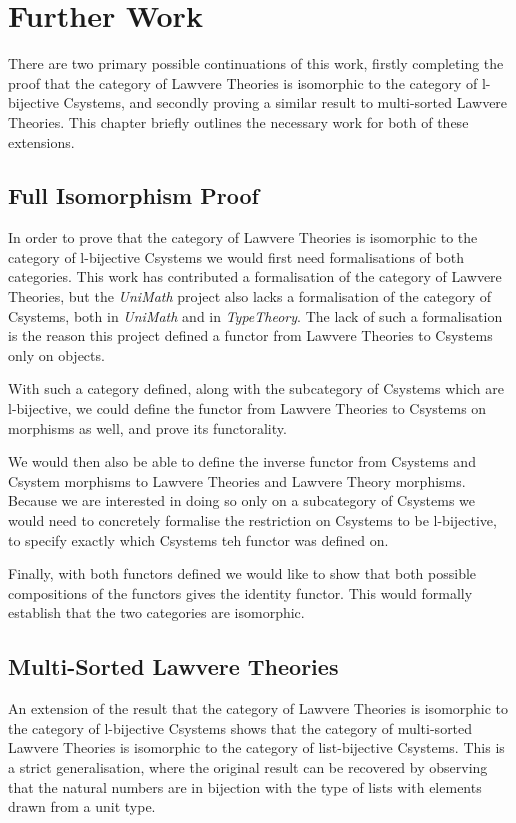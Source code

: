 \chapter{Further Work}
There are two primary possible continuations of this work, firstly completing
the proof that the category of Lawvere Theories is isomorphic to the category of
l-bijective Csystems, and secondly proving a similar result to multi-sorted
Lawvere Theories. This chapter briefly outlines the necessary work for both of
these extensions.

\section{Full Isomorphism Proof}
In order to prove that the category of Lawvere Theories is isomorphic to the
category of l-bijective Csystems we would first need formalisations of both
categories. This work has contributed a formalisation of the category of Lawvere
Theories, but the \textit{UniMath} project also lacks a formalisation of the
category of Csystems, both in \textit{UniMath} and in \textit{TypeTheory}. The
lack of such a formalisation is the reason this project defined a functor from
Lawvere Theories to Csystems only on objects.

With such a category defined, along with the subcategory of Csystems which are
l-bijective, we could define the functor from Lawvere Theories to Csystems on
morphisms as well, and prove its functorality.

We would then also be able to define the inverse functor from Csystems and
Csystem morphisms to Lawvere Theories and Lawvere Theory morphisms. Because we
are interested in doing so only on a subcategory of Csystems we would need to
concretely formalise the restriction on Csystems to be l-bijective, to specify
exactly which Csystems teh functor was defined on.

Finally, with both functors defined we would like to show that both possible
compositions of the functors gives the identity functor. This would formally
establish that the two categories are isomorphic.

\section{Multi-Sorted Lawvere Theories}
An extension of the result that the category of Lawvere Theories is isomorphic
to the category of l-bijective Csystems shows that the category of multi-sorted
Lawvere Theories is isomorphic to the category of list-bijective Csystems. This
is a strict generalisation, where the original result can be recovered by
observing that the natural numbers are in bijection with the type of lists with
elements drawn from a unit type.